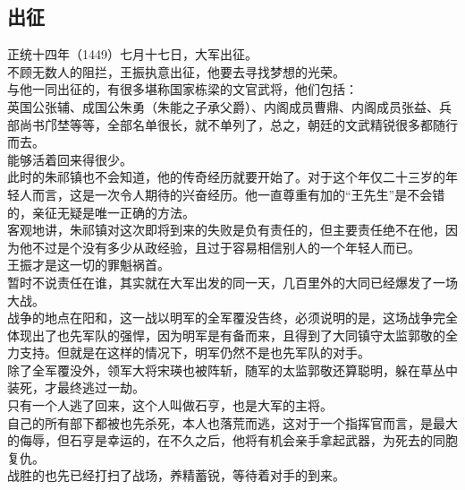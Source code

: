 \begin{multicols}{\theparacolNo}
\subsection{出征}
正统十四年（1449）七月十七日，大军出征。\\

不顾无数人的阻拦，王振执意出征，他要去寻找梦想的光荣。\\

与他一同出征的，有很多堪称国家栋梁的文官武将，他们包括：\\

英国公张辅、成国公朱勇（朱能之子承父爵）、内阁成员曹鼎、内阁成员张益、兵部尚书邝埜等等，全部名单很长，就不单列了，总之，朝廷的文武精锐很多都随行而去。\\

能够活着回来得很少。\\

此时的朱祁镇也不会知道，他的传奇经历就要开始了。对于这个年仅二十三岁的年轻人而言，这是一次令人期待的兴奋经历。他一直尊重有加的“王先生”是不会错的，亲征无疑是唯一正确的方法。\\

客观地讲，朱祁镇对这次即将到来的失败是负有责任的，但主要责任绝不在他，因为他不过是个没有多少从政经验，且过于容易相信别人的一个年轻人而已。\\

王振才是这一切的罪魁祸首。\\

暂时不说责任在谁，其实就在大军出发的同一天，几百里外的大同已经爆发了一场大战。\\

战争的地点在阳和，这一战以明军的全军覆没告终，必须说明的是，这场战争完全体现出了也先军队的强悍，因为明军是有备而来，且得到了大同镇守太监郭敬的全力支持。但就是在这样的情况下，明军仍然不是也先军队的对手。\\

除了全军覆没外，领军大将宋瑛也被阵斩，随军的太监郭敬还算聪明，躲在草丛中装死，才最终逃过一劫。\\

只有一个人逃了回来，这个人叫做石亨，也是大军的主将。\\

自己的所有部下都被也先杀死，本人也落荒而逃，这对于一个指挥官而言，是最大的侮辱，但石亨是幸运的，在不久之后，他将有机会亲手拿起武器，为死去的同胞复仇。\\

战胜的也先已经打扫了战场，养精蓄锐，等待着对手的到来。\\


\end{multicols}
